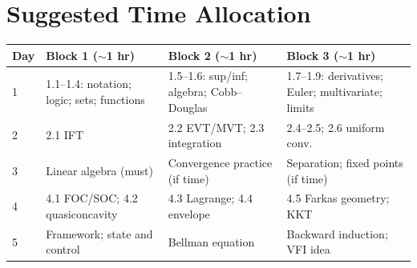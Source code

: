 \documentclass[11pt,a4paper]{article}
\begin{document}
\section{Suggested Time Allocation}

\begin{center}
\begin{tabular}{@{}p{}p{}p{}p{}@{}}
\toprule
\textbf{Day} & \textbf{Block 1 ($\sim$1 hr)} & \textbf{Block 2 ($\sim$1 hr)} & \textbf{Block 3 ($\sim$1 hr)} \\
\midrule
1 & 1.1--1.4: notation; logic; sets; functions & 1.5--1.6: sup/inf; algebra; Cobb--Douglas & 1.7--1.9: derivatives; Euler; multivariate; limits \\
2 & 2.1 IFT & 2.2 EVT/MVT; 2.3 integration & 2.4--2.5; 2.6 uniform conv. \\
3 & Linear algebra (must) & Convergence practice (if time) & Separation; fixed points (if time) \\
4 & 4.1 FOC/SOC; 4.2 quasiconcavity & 4.3 Lagrange; 4.4 envelope & 4.5 Farkas geometry; KKT \\
5 & Framework; state and control & Bellman equation & Backward induction; VFI idea \\
\bottomrule
\end{tabular}
\end{center}
\end{document}
